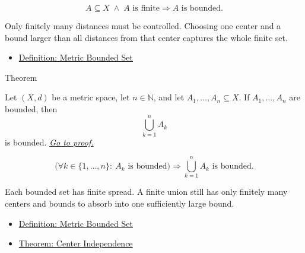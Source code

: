 \begin{remark*}
\[
A\subseteq X
\;\land\;
A\text{ is finite}
\Longrightarrow
A\text{ is bounded}.
\]
\end{remark*}

\begin{remark*}[Interpretation]
Only finitely many distances must be controlled.  Choosing one center and a
bound larger than all distances from that center captures the whole finite
set.
\end{remark*}

\begin{dependencies}
\begin{itemize}
  \item \hyperref[def:metric-bounded-set]{Definition: Metric Bounded Set}
\end{itemize}
\end{dependencies}

\begin{theorembox}{Theorem}
\begin{theorem}
\label{thm:metric-finite-unions-bounded-sets-bounded}
Let \((X,d)\) be a metric space, let \(n\in\mathbb{N}\), and let
\(A_1,\ldots,A_n\subseteq X\).  If \(A_1,\ldots,A_n\) are bounded, then
\[
  \bigcup_{k=1}^n A_k
\]
is bounded.
\hyperref[prf:metric-finite-unions-bounded-sets-bounded]{\textit{Go to proof.}}
\end{theorem}
\end{theorembox}

\begin{remark*}
\[
\bigl(\forall k\in\{1,\ldots,n\}{:}\ A_k\text{ is bounded}\bigr)
\Longrightarrow
\bigcup_{k=1}^n A_k\text{ is bounded}.
\]
\end{remark*}

\begin{remark*}[Interpretation]
Each bounded set has finite spread.  A finite union still has only finitely
many centers and bounds to absorb into one sufficiently large bound.
\end{remark*}

\begin{dependencies}
\begin{itemize}
  \item \hyperref[def:metric-bounded-set]{Definition: Metric Bounded Set}
  \item \hyperref[thm:metric-bounded-center-independence]{Theorem: Center Independence}
\end{itemize}
\end{dependencies}

